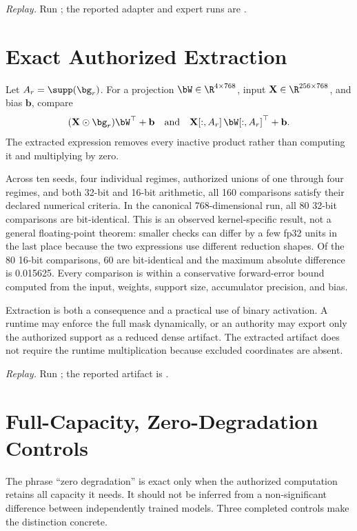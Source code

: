 \documentclass[11pt]{article}
\begin{document}
\noindent\textit{Replay.} Run
; the reported adapter and
expert runs are .

\section{Exact Authorized Extraction}

Let $A_r=\supp(\bg_r)$. For a projection $\bW\in\R^{4\times768}$,
input $\mathbf X\in\R^{256\times768}$, and bias $\mathbf b$, compare
\begin{equation}
  (\mathbf X\odot\bg_r)\bW^\top+\mathbf b
  \quad\text{and}\quad
  \mathbf X[:,A_r]\,\bW[:,A_r]^\top+\mathbf b.
\end{equation}
The extracted expression removes every inactive product rather than computing
it and multiplying by zero.

Across ten seeds, four individual regimes, authorized unions of one through
four regimes, and both 32-bit and 16-bit arithmetic, all 160 comparisons satisfy
their declared numerical criteria. In the canonical 768-dimensional run, all
80 32-bit comparisons are bit-identical. This is an observed kernel-specific
result, not a general floating-point theorem: smaller checks can differ by a
few fp32 units in the last place because the two expressions use different
reduction shapes. Of the 80 16-bit comparisons, 60 are bit-identical and the
maximum absolute difference is 0.015625. Every comparison is within a
conservative forward-error bound computed from the input, weights, support
size, accumulator precision, and bias.

Extraction is both a consequence and a practical use of binary activation. A
runtime may enforce the full mask dynamically, or an authority may export only
the authorized support as a reduced dense artifact. The extracted artifact does
not require the runtime multiplication because excluded coordinates are absent.

\noindent\textit{Replay.} Run ; the
reported artifact is
.

\section{Full-Capacity, Zero-Degradation Controls}

The phrase ``zero degradation'' is exact only when the authorized computation
retains all capacity it needs. It should not be inferred from a non-significant
difference between independently trained models. Three completed controls make
the distinction concrete.
\end{document}
